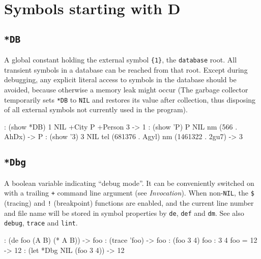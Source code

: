 %
%
%



\chapter{Symbols starting with D}
\label{sec:func-ref-D-symbols-starting-with-D}

 
\section*{\texttt{*DB}}
\label{sec:func-ref-D-*DB}

A global constant holding the external symbol \texttt{\{1\}}, the \texttt{database}
root. All transient symbols in a database can be reached from that root.
Except during debugging, any explicit literal access to symbols in the
database should be avoided, because otherwise a memory leak might occur
(The garbage collector temporarily sets \texttt{*DB} to \texttt{NIL} and restores its
value after collection, thus disposing of all external symbols not
currently used in the program).


\begin{wideverbatim}
: (show *DB)
{1} NIL
   +City {P}
   +Person {3}
-> {1}
: (show '{P})
{P} NIL
   nm (566 . {AhDx})
-> {P}
: (show '{3})
{3} NIL
   tel (681376 . {Agyl})
   nm (1461322 . {2gu7})
-> {3}
\end{wideverbatim}

 
\section*{\texttt{*Dbg}}
\label{sec:func-ref-D-*Dbg}


A boolean variable indicating ``debug mode''. It can be conveniently
switched on with a trailing \texttt{+} command line argument (see
\emph{Invocation}). When non-\texttt{NIL}, the \texttt{\$} (tracing) and
\texttt{!} (breakpoint) functions are enabled, and the current line number and
file name will be stored in symbol properties by \texttt{de}, \texttt{def} and \texttt{dm}.
See also \texttt{debug}, \texttt{trace} and \texttt{lint}.


\begin{wideverbatim}
: (de foo (A B) (* A B))
-> foo
: (trace 'foo)
-> foo
: (foo 3 4)
 foo : 3 4
 foo = 12
-> 12
: (let *Dbg NIL (foo 3 4))
-> 12
\end{wideverbatim}

